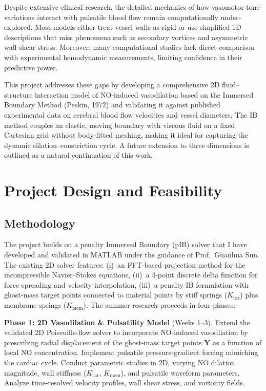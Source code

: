 \documentclass[12pt]{article}
\begin{document}
Despite extensive clinical research, the detailed mechanics of how vasomotor tone variations interact with pulsatile blood flow remain computationally under-explored. Most models either treat vessel walls as rigid or use simplified 1D descriptions that miss phenomena such as secondary vortices and asymmetric wall shear stress. Moreover, many computational studies lack direct comparison with experimental hemodynamic measurements, limiting confidence in their predictive power.

This project addresses these gaps by developing a comprehensive 2D fluid--structure interaction model of NO-induced vasodilation based on the Immersed Boundary Method (Peskin, 1972) and validating it against published experimental data on cerebral blood flow velocities and vessel diameters. The IB method couples an elastic, moving boundary with viscous fluid on a fixed Cartesian grid without body-fitted meshing, making it ideal for capturing the dynamic dilation--constriction cycle. A future extension to three dimensions is outlined as a natural continuation of this work.

\section*{Project Design and Feasibility}

\subsection*{Methodology}

The project builds on a penalty Immersed Boundary (pIB) solver that I have developed and validated in MATLAB under the guidance of Prof.\ Guanhua Sun. The existing 2D solver features: (i)~an FFT-based projection method for the incompressible Navier--Stokes equations, (ii)~a 4-point discrete delta function for force spreading and velocity interpolation, (iii)~a penalty IB formulation with ghost-mass target points connected to material points by stiff springs ($K_{\mathrm{tar}}$) plus membrane springs ($K_{\mathrm{mem}}$). The summer research proceeds in four phases:

\textbf{Phase 1: 2D Vasodilation \& Pulsatility Model} (Weeks 1--3). Extend the validated 2D Poiseuille-flow solver to incorporate NO-induced vasodilation by prescribing radial displacement of the ghost-mass target points $\mathbf{Y}$ as a function of local NO concentration. Implement pulsatile pressure-gradient forcing mimicking the cardiac cycle. Conduct parametric studies in 2D, varying NO dilation magnitude, wall stiffness ($K_{\mathrm{tar}}$, $K_{\mathrm{mem}}$), and pulsatile waveform parameters. Analyze time-resolved velocity profiles, wall shear stress, and vorticity fields.
\end{document}
